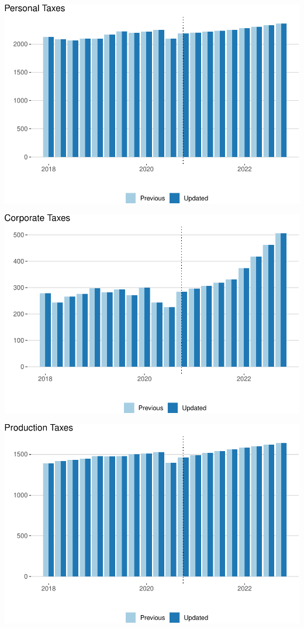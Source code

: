 \documentclass[
]{article}
\begin{document}
\begin{center}\includegraphics{update-changes-levels_files/figure-latex/personal-tax-1} \end{center}

\begin{center}\includegraphics{update-changes-levels_files/figure-latex/corporate-tax-1} \end{center}

\begin{center}\includegraphics{update-changes-levels_files/figure-latex/production-taxes-1} \end{center}
\end{document}
